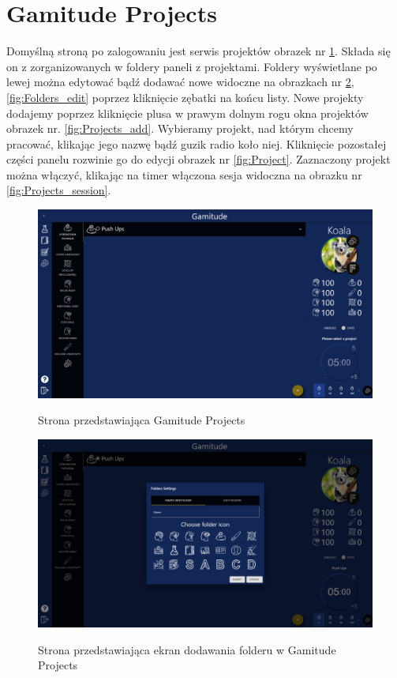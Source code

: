 \documentclass[a4paper,11pt]{report}
\begin{document}
\section{Gamitude Projects}
Domyślną stroną po zalogowaniu jest serwis projektów obrazek nr \ref{fig:Projects}.
Składa się on z zorganizowanych w foldery paneli z projektami.
Foldery wyświetlane po lewej można edytować bądź dodawać nowe widoczne na obrazkach nr \ref{fig:Folders_add}, \ref{fig:Folders_edit} poprzez kliknięcie zębatki na końcu listy.
Nowe projekty dodajemy poprzez kliknięcie plusa w prawym dolnym rogu okna projektów obrazek nr. \ref{fig:Projects_add}.
Wybieramy projekt, nad którym chcemy pracować, klikając jego nazwę bądź guzik radio koło niej.
Kliknięcie pozostałej części panelu rozwinie go do edycji obrazek nr \ref{fig:Project}.
Zaznaczony projekt można włączyć, klikając na timer włączona sesja widoczna na obrazku nr \ref{fig:Projects_session}.
\begin{figure}[H]
	\centering
	\includegraphics[scale=0.3]{prezentacja/Projects}\\
	\caption{Strona przedstawiająca Gamitude Projects}
	\label{fig:Projects}
\end{figure}
\begin{figure}[H]
	\centering
	\includegraphics[scale=0.3]{prezentacja/Folders_add}\\
	\caption{Strona przedstawiająca ekran dodawania folderu w Gamitude Projects}
	\label{fig:Folders_add}
\end{figure}
\end{document}
